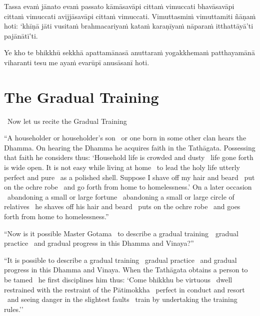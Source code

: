 Tassa evaṁ jānato evaṁ passato kāmāsavāpi cittaṁ vimuccati bhavāsavāpi cittaṁ vimuccati avijjāsavāpi cittaṁ vimuccati. Vimuttasmiṁ vimuttamiti ñāṇaṁ hoti: `khīṇā jāti vusitaṁ brahmacariyaṁ kataṁ karaṇīyaṁ nāparaṁ itthattāyā'ti pajānātī'ti.

\suttaRef{[MN 39]}

Ye kho te bhikkhū sekkhā apattamānasā anuttaraṁ yogakkhemaṁ patthayamānā viharanti tesu me ayaṁ evarūpī anusāsanī hoti.

\suttaRef{[MN 107]}

\section{The Gradual Training}
\label{gradual-training}

\begin{leader-english}
  \anglebracketleft\ \hspace{-0.5mm}Now let us recite the Gradual Training \hspace{-0.5mm}\anglebracketright\
\end{leader-english}
\begin{english-only-justify}
  ``A householder or householder's son \breathmark\ or one born in some other clan hears the Dhamma. On hearing the Dhamma he acquires faith in the Tathāgata. Possessing that faith he considers thus: `Household life is crowded and dusty \breathmark\ life gone forth is wide open. It is not easy while living at home \breathmark\ to lead the holy life utterly perfect and pure \breathmark\ as a polished shell. Suppose I shave off my hair and beard \breathmark\ put on the ochre robe \breathmark\ and go forth from home to homelessness.' On a later occasion \breathmark\ abandoning a small or large fortune \breathmark\ abandoning a small or large circle of relatives \breathmark\ he shaves off his hair and beard \breathmark\ puts on the ochre robe \breathmark\ and goes forth from home to homelessness.''
\end{english-only-justify}

\suttaRef{[MN 27 / 38 / 51]}

\begin{english-only-justify}
  ``Now is it possible Master Gotama \breathmark\ to describe a gradual \mbox{training}~\breathmark\ gradual practice \breathmark\ and gradual progress in this Dhamma and Vinaya?''
\end{english-only-justify}

\begin{english-only-justify}
  ``It is possible to describe a gradual training \breathmark\ gradual practice \breathmark\ and gradual progress in this Dhamma and Vinaya. When the Tathāgata obtains a person to be tamed \breathmark\ he first disciplines him thus: `Come bhikkhu be virtuous \breathmark\ dwell restrained with the restraint of the Pātimokkha \breathmark\ perfect in conduct and resort \breathmark\ and seeing danger in the slightest faults \breathmark\ train by undertaking the training rules.''
\end{english-only-justify}

